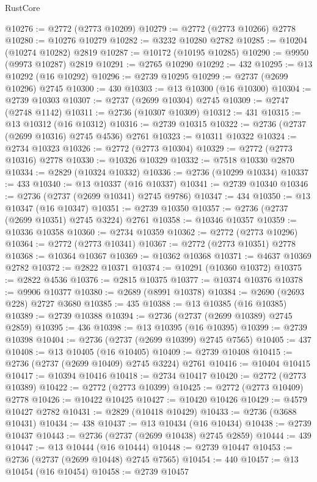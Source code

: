 \begin{lexlean}{RustCore}
\begin{coremodule}
@10276 := @2772 (@2773 @10209)
@10279 := @2772 (@2773 @10266) @2778
@10280 := @10276 @10279
@10282 := @3232 @10280 @2782
@10285 := @10204 (@10274 @10282) @2819
@10287 := @10172 (@10195 @10285)
@10290 := @9950 (@9973 @10287) @2819
@10291 := @2765 @10290
@10292 := 432
@10295 := @13 @10292 (@16 @10292)
@10296 := @2739 @10295
@10299 := @2737 (@2699 @10296) @2745
@10300 := 430
@10303 := @13 @10300 (@16 @10300)
@10304 := @2739 @10303
@10307 := @2737 (@2699 @10304) @2745
@10309 := @2747 (@2748 @1142)
@10311 := @2736 (@10307 @10309)
@10312 := 431
@10315 := @13 @10312 (@16 @10312)
@10316 := @2739 @10315
@10322 := @2736 (@2737 (@2699 @10316) @2745 @4536) @2761
@10323 := @10311 @10322
@10324 := @2734 @10323
@10326 := @2772 (@2773 @10304)
@10329 := @2772 (@2773 @10316) @2778
@10330 := @10326 @10329
@10332 := @7518 @10330 @2870
@10334 := @2829 (@10324 @10332)
@10336 := @2736 (@10299 @10334)
@10337 := 433
@10340 := @13 @10337 (@16 @10337)
@10341 := @2739 @10340
@10346 := @2736 (@2737 (@2699 @10341) @2745 @9786)
@10347 := 434
@10350 := @13 @10347 (@16 @10347)
@10351 := @2739 @10350
@10357 := @2736 (@2737 (@2699 @10351) @2745 @3224) @2761
@10358 := @10346 @10357
@10359 := @10336 @10358
@10360 := @2734 @10359
@10362 := @2772 (@2773 @10296)
@10364 := @2772 (@2773 @10341)
@10367 := @2772 (@2773 @10351) @2778
@10368 := @10364 @10367
@10369 := @10362 @10368
@10371 := @4637 @10369 @2782
@10372 := @2822 @10371
@10374 := @10291 (@10360 @10372)
@10375 := @2822 @4536
@10376 := @2815 @10375
@10377 := @10374 @10376
@10378 := @9906 @10377
@10380 := @2689 (@8991 @10378)
@10384 := @2690 (@2693 @228) @2727 @3680
@10385 := 435
@10388 := @13 @10385 (@16 @10385)
@10389 := @2739 @10388
@10394 := @2736 (@2737 (@2699 @10389) @2745 @2859)
@10395 := 436
@10398 := @13 @10395 (@16 @10395)
@10399 := @2739 @10398
@10404 := @2736 (@2737 (@2699 @10399) @2745 @7565)
@10405 := 437
@10408 := @13 @10405 (@16 @10405)
@10409 := @2739 @10408
@10415 := @2736 (@2737 (@2699 @10409) @2745 @3224) @2761
@10416 := @10404 @10415
@10417 := @10394 @10416
@10418 := @2734 @10417
@10420 := @2772 (@2773 @10389)
@10422 := @2772 (@2773 @10399)
@10425 := @2772 (@2773 @10409) @2778
@10426 := @10422 @10425
@10427 := @10420 @10426
@10429 := @4579 @10427 @2782
@10431 := @2829 (@10418 @10429)
@10433 := @2736 (@3688 @10431)
@10434 := 438
@10437 := @13 @10434 (@16 @10434)
@10438 := @2739 @10437
@10443 := @2736 (@2737 (@2699 @10438) @2745 @2859)
@10444 := 439
@10447 := @13 @10444 (@16 @10444)
@10448 := @2739 @10447
@10453 := @2736 (@2737 (@2699 @10448) @2745 @7565)
@10454 := 440
@10457 := @13 @10454 (@16 @10454)
@10458 := @2739 @10457

\end{coremodule}
\end{lexlean}
